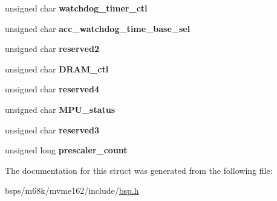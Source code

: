 \begin{DoxyCompactItemize}
\item 
\mbox{\label{structmcchip__regs_a715f6db09791855b23e0bb88ef46b0ae}} 
unsigned char {\bfseries watchdog\+\_\+timer\+\_\+ctl}
\item 
\mbox{\label{structmcchip__regs_afb1c23ae970e9f74d59cf57df630502f}} 
unsigned char {\bfseries acc\+\_\+watchdog\+\_\+time\+\_\+base\+\_\+sel}
\item 
\mbox{\label{structmcchip__regs_aa70a6274edf18fc231ea403fb199bf03}} 
unsigned char {\bfseries reserved2}
\item 
\mbox{\label{structmcchip__regs_a36c0bb9826c0e6e4f783b798758d21bb}} 
unsigned char {\bfseries D\+R\+A\+M\+\_\+ctl}
\item 
\mbox{\label{structmcchip__regs_a7f015ac69b468a4d1bbd55f94ed44e3c}} 
unsigned char {\bfseries reserved4}
\item 
\mbox{\label{structmcchip__regs_a2fcfc8cf0dd5d31a5ebde0f6731caab9}} 
unsigned char {\bfseries M\+P\+U\+\_\+status}
\item 
\mbox{\label{structmcchip__regs_a7f854c3406e20bf654bff14576dd2a58}} 
unsigned char {\bfseries reserved3}
\item 
\mbox{\label{structmcchip__regs_a4e1dadb2c238b9ec2a5d3f1c213ec7cc}} 
unsigned long {\bfseries prescaler\+\_\+count}
\end{DoxyCompactItemize}


The documentation for this struct was generated from the following file\+:\begin{DoxyCompactItemize}
\item 
bsps/m68k/mvme162/include/\mbox{\hyperlink{bsps_2m68k_2mvme162_2include_2bsp_8h}{bsp.\+h}}\end{DoxyCompactItemize}
